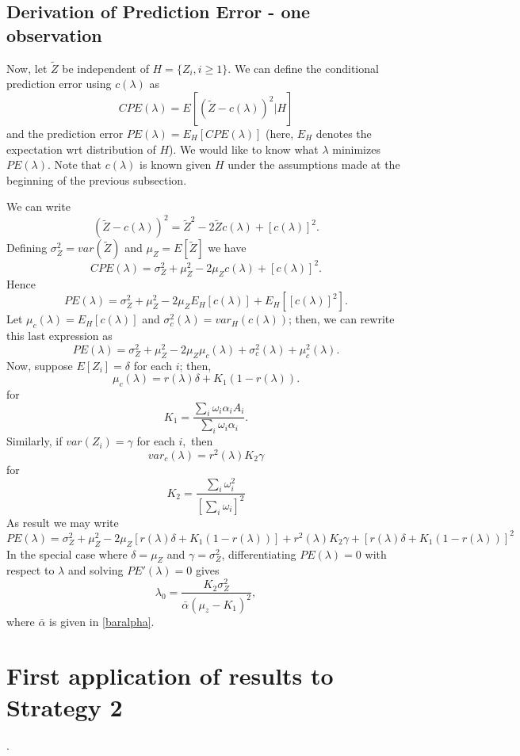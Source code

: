 \documentclass[12pt]{article}
\begin{document}
\subsection{Derivation of Prediction Error - one observation}
\label{PE}
Now, let $\tilde{Z}$ be independent of $H = \{Z_i, i \geq 1\}.$ We can define the conditional prediction error using $c(\lambda)$
as
\[
CPE(\lambda) = E\left[ (\tilde Z - c(\lambda))^2 | H \right]
\] 
and the prediction error $PE(\lambda) = E_H\left[ CPE(\lambda) \right]$ (here, $E_H$ 
denotes the expectation wrt distribution of $H$).  We would like to know what $\lambda$ 
minimizes $PE(\lambda)$. Note that $c(\lambda)$ is known given $H$ under the assumptions made
at the beginning of the previous subsection.

We can write
\[
(\tilde Z - c(\lambda))^2 = \tilde Z^2 - 2 \tilde Z c(\lambda) + [c(\lambda)]^2.
\]
Defining $\sigma^2_Z = var(\tilde Z)$ and $\mu_Z = E[\tilde Z]$ we have
\[
CPE(\lambda) = \sigma^2_Z + \mu^2_Z - 2 \mu_Z c(\lambda) + [c(\lambda)]^2.
\]
Hence
\[
PE(\lambda) = \sigma^2_Z + \mu^2_Z - 2 \mu_Z E_H[c(\lambda)] + E_H[[c(\lambda)]^2].
\]
Let $\mu_c(\lambda) = E_H[c(\lambda)] $ and $\sigma^2_c(\lambda) = var_H(c(\lambda))$; then, we can rewrite
this last expression as 
\[
PE(\lambda) = \sigma^2_Z + \mu^2_Z - 2 \mu_Z \mu_c(\lambda) + \sigma^2_c(\lambda) + \mu^2_c(\lambda).
\]
Now, suppose $E[Z_i] = \delta$ for each $i$; then,
\[
\mu_c(\lambda) = r(\lambda) \delta+ K_1 (1-r(\lambda)).
\]
for
\[
K_1 =  \frac{ \sum_i \omega_i \alpha_i A_i}{ \sum_i \omega_i \alpha_i }.
\]
Similarly, if $var(Z_i) = \gamma$ for each $i,$ then
\[
var_c(\lambda) = r^2(\lambda) K_2 \gamma
\]
for 
\[
K_2 = \frac{ \sum_i \omega_i^2 }{[ \sum_i \omega_i]^2}
\]
As result we may write
\[
PE(\lambda) = \sigma^2_Z + \mu^2_Z - 2 \mu_Z [r(\lambda) \delta + K_1 (1-r(\lambda)) ] + 
r^2(\lambda) K_2 \gamma + 
[r(\lambda) \delta + K_1 (1-r(\lambda))]^2
\]
In the special case where  $\delta = \mu_Z$ and $\gamma = \sigma^2_Z$, differentiating 
$PE(\lambda) = 0$ with respect to $\lambda$ and solving $PE'(\lambda) = 0$ gives
\begin{equation}
\label{lam-opt}
\lambda_0 = \frac{K_2 \sigma^2_Z}{ \bar{\alpha} (\mu_z - K_1)^2},
\end{equation}
where $\bar \alpha$ is given in \eqref{baralpha}.



\section{First application of results to Strategy 2}.
\end{document}
